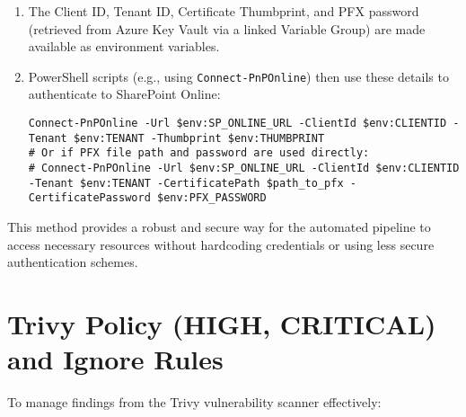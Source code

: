 \begin{itemize}
\begin{itemize}
\begin{enumerate}
            \item The Client ID, Tenant ID, Certificate Thumbprint, and PFX password (retrieved from Azure Key Vault via a linked Variable Group) are made available as environment variables.
            \item PowerShell scripts (e.g., using \texttt{Connect-PnPOnline}) then use these details to authenticate to SharePoint Online:
\begin{verbatim}
Connect-PnPOnline -Url $env:SP_ONLINE_URL -ClientId $env:CLIENTID -Tenant $env:TENANT -Thumbprint $env:THUMBPRINT
# Or if PFX file path and password are used directly:
# Connect-PnPOnline -Url $env:SP_ONLINE_URL -ClientId $env:CLIENTID -Tenant $env:TENANT -CertificatePath $path_to_pfx -CertificatePassword $env:PFX_PASSWORD
\end{verbatim}
        \end{enumerate}
    \end{itemize}
\end{itemize}

This method provides a robust and secure way for the automated pipeline to access necessary resources without hardcoding credentials or using less secure authentication schemes.

\section{Trivy Policy (HIGH, CRITICAL) and Ignore Rules}
\label{sec:TrivyPolicyIgnoreRules}

To manage findings from the Trivy vulnerability scanner effectively:

